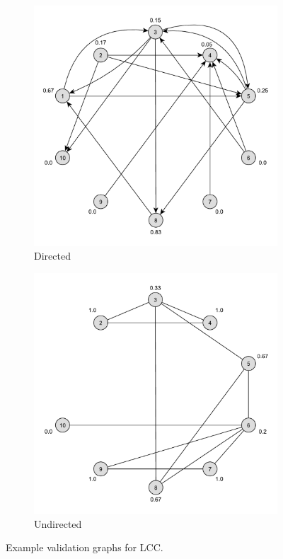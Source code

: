\begin{figure}[h]
	\centering
	\begin{subfigure}{0.496\textwidth}
		\centering
		\includegraphics[scale=\examplescale]{figures/examples/lcc-dir.pdf}
		\caption{Directed}
	\end{subfigure}
	\begin{subfigure}{0.496\textwidth}
		\centering
		\includegraphics[scale=\examplescale]{figures/examples/lcc-undir.pdf}
		\caption{Undirected}
	\end{subfigure}
	\caption{Example validation graphs for LCC.}
	\label{fig:lcc_example}
\end{figure}

